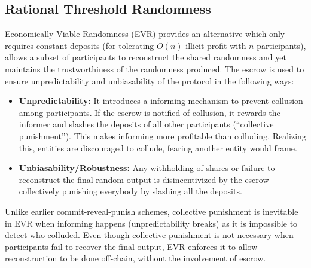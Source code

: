 \documentclass[letterpaper,twocolumn,10pt]{article}
\theoremstyle{definition}
\theoremstyle{remark}
\begin{document}
\subsection{Rational Threshold Randomness}
Economically Viable Randomness (EVR) \cite{david2020economically} provides an alternative which only requires constant deposits (for tolerating $O(n)$ illicit profit with $n$ participants), allows a subset of participants to reconstruct the shared randomness and yet maintains the trustworthiness of the randomness produced. The escrow is used to ensure unpredictability and unbiasability of the protocol in the following ways: 
\begin{itemize}
    \item \textbf{Unpredictability:} It introduces a informing mechanism to prevent collusion among participants. If the escrow is notified of collusion, it rewards the informer and slashes the deposits of all other participants (``collective punishment''). This makes informing more profitable than colluding. Realizing this, entities are discouraged to collude, fearing another entity would frame.
    \item \textbf{Unbiasability/Robustness:} Any withholding of shares or failure to reconstruct the final random output is disincentivized by the escrow collectively punishing everybody by slashing all the deposits.
\end{itemize}

Unlike earlier commit-reveal-punish schemes, collective punishment is inevitable in EVR when informing happens (unpredictability breaks) as it is impossible to detect who colluded. Even though collective punishment is not necessary when participants fail to recover the final output, EVR enforces it to allow reconstruction to be done off-chain, without the involvement of escrow. 
\end{document}
